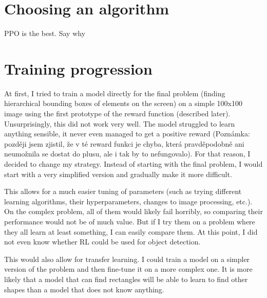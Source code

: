 \documentclass[
  digital,     %
  oneside,     %
  nosansbold,  %
  nocolorbold, %
  lof,         %
  lot,         %
]{fithesis4}
\begin{document}
\section{Choosing an algorithm}
PPO is the best. Say why

\section{Training progression}
At first, I tried to train a model directly for the final problem (finding hierarchical bounding boxes of elements on the screen) on a simple 100x100 image using the first prototype of the reward function (described later). Unsurprisingly, this did not work very well. The model struggled to learn anything sensible, it never even managed to get a positive reward (Poznámka: později jsem zjistil, že v té reward funkci je chyba, která pravděpodobně ani neumožnila se dostat do plusu, ale i tak by to nefungovalo). For that reason, I decided to change my strategy. Instead of starting with the final problem, I would start with a very simplified version and gradually make it more difficult.

This allows for a much easier tuning of parameters (such as trying different learning algorithms, their hyperparameters, changes to image processing, etc.). On the complex problem, all of them would likely fail horribly, so comparing their performance would not be of much value. But if I try them on a problem where they all learn at least something, I can easily compare them. At this point, I did not even know whether RL could be used for object detection.

This would also allow for transfer learning. I could train a model on a simpler version of the problem and then fine-tune it on a more complex one. It is more likely that a model that can find rectangles will be able to learn to find other shapes than a model that does not know anything.
\end{document}

